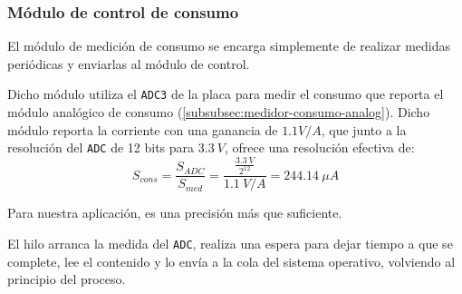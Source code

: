 \subsubsection{Módulo de control de consumo}

El módulo de medición de consumo se encarga simplemente de realizar medidas periódicas y enviarlas al módulo de control.

Dicho módulo utiliza el \texttt{ADC3} de la placa para medir el consumo que reporta el módulo analógico de consumo (\autoref{subsubsec:medidor-consumo-analog}). Dicho módulo reporta la corriente con una ganancia de $1.1 V/A$, que junto a la resolución del \texttt{ADC} de 12 bits para $3.3\ V$, ofrece una resolución efectiva de:
\[
    S_{cons} = \frac{S_{ADC}}{S_{med}} = \frac{\frac{3.3\ V}{2^{12}}}{1.1\ V/A} = 244.14\ \mu A
\]

Para nuestra aplicación, es una precisión más que suficiente.

El hilo arranca la medida del \texttt{ADC}, realiza una espera para dejar tiempo a que se complete, lee el contenido y lo envía a la cola del sistema operativo, volviendo al principio del proceso.